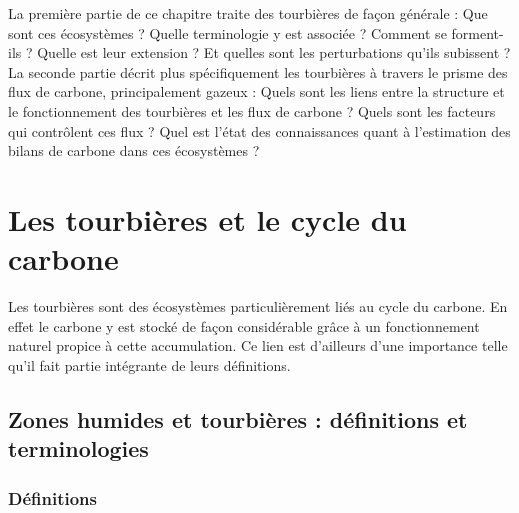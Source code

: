 \newpage
\doublespacing
{}
La première partie de ce chapitre traite des tourbières de façon générale : Que sont ces écosystèmes ?
Quelle terminologie y est associée ? Comment se forment-ils ? Quelle est leur extension ? Et quelles sont les perturbations qu'ils subissent ?
La seconde partie décrit plus spécifiquement les tourbières à travers le prisme des flux de carbone, principalement gazeux : 
Quels sont les liens entre la structure et le fonctionnement des tourbières et les flux de carbone ? 
Quels sont les facteurs qui contrôlent ces flux ? 
Quel est l'état des connaissances quant à l'estimation des bilans de carbone dans ces écosystèmes ?

\section{Les tourbières et le cycle du carbone}

Les tourbières sont des écosystèmes particulièrement liés au cycle du carbone.
En effet le carbone y est stocké de façon considérable grâce à un fonctionnement naturel propice à cette accumulation.
Ce lien est d'ailleurs d'une importance telle qu'il fait partie intégrante de leurs définitions.


\subsection{Zones humides et tourbières : définitions et terminologies}

\subsubsection{Définitions}

